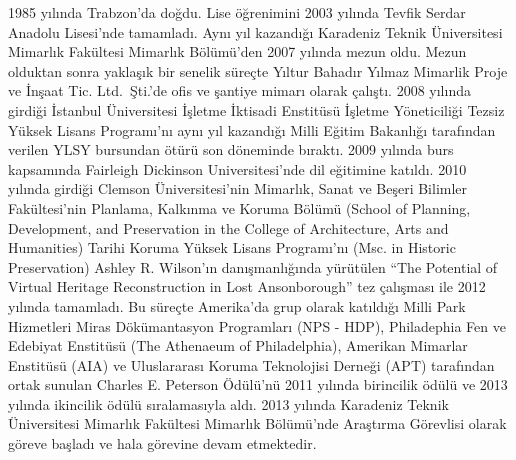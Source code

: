1985 yılında Trabzon'da doğdu. Lise öğrenimini 2003 yılında Tevfik
Serdar Anadolu Lisesi'nde tamamladı. Aynı yıl kazandığı Karadeniz Teknik
Üniversitesi Mimarlık Fakültesi Mimarlık Bölümü'den 2007 yılında mezun
oldu. Mezun olduktan sonra yaklaşık bir senelik süreçte Yıltur Bahadır
Yılmaz Mimarlik Proje ve İnşaat Tic. Ltd.~Şti.'de ofis ve şantiye mimarı
olarak çalıştı. 2008 yılında girdiği İstanbul Üniversitesi İşletme
İktisadi Enstitüsü İşletme Yöneticiliği Tezsiz Yüksek Lisans Programı'nı
aynı yıl kazandığı Milli Eğitim Bakanlığı tarafından verilen YLSY
bursundan ötürü son döneminde bıraktı. 2009 yılında burs kapsamında
Fairleigh Dickinson Universitesi'nde dil eğitimine katıldı. 2010 yılında
girdiği Clemson Üniversitesi'nin Mimarlık, Sanat ve Beşeri Bilimler
Fakültesi'nin Planlama, Kalkınma ve Koruma Bölümü (School of Planning,
Development, and Preservation in the College of Architecture, Arts and
Humanities) Tarihi Koruma Yüksek Lisans Programı'nı (Msc. in Historic
Preservation) Ashley R. Wilson'ın danışmanlığında yürütülen ``The
Potential of Virtual Heritage Reconstruction in Lost Ansonborough'' tez
çalışması ile 2012 yılında tamamladı. Bu süreçte Amerika'da grup olarak
katıldığı Milli Park Hizmetleri Miras Dökümantasyon Programları (NPS -
HDP), Philadephia Fen ve Edebiyat Enstitüsü (The Athenaeum of
Philadelphia), Amerikan Mimarlar Enstitüsü (AIA) ve Uluslararası Koruma
Teknolojisi Derneği (APT) tarafından ortak sunulan Charles E. Peterson
Ödülü'nü 2011 yılında birincilik ödülü ve 2013 yılında ikincilik ödülü
sıralamasıyla aldı. 2013 yılında Karadeniz Teknik Üniversitesi Mimarlık
Fakültesi Mimarlık Bölümü'nde Araştırma Görevlisi olarak göreve başladı
ve hala görevine devam etmektedir.
